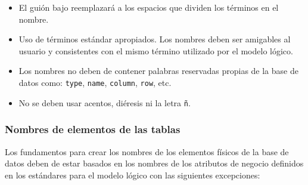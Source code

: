 \begin{itemize}

\item El guión bajo reemplazará a los espacios que dividen los términos en el
  nombre.

\item Uso de términos estándar apropiados. Los nombres deben ser amigables al
  usuario y consistentes con el mismo término utilizado por el modelo lógico.

\item Los nombres no deben de contener palabras reservadas propias de la base de
  datos como: \texttt{type}, \texttt{name}, \texttt{column}, \texttt{row}, etc.

\item No se deben usar acentos, diéresis ni la letra \texttt{ñ}.

\end{itemize}

\subsubsection{Nombres de elementos de las tablas}

Los fundamentos para crear los nombres de los elementos físicos de la base de
datos deben de estar basados en los nombres de los atributos de negocio
definidos en los estándares para el modelo lógico con las siguientes
excepciones:

